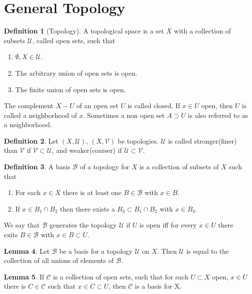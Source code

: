 \documentclass[twocolumn]{article}
\theoremstyle{definition}
\newtheorem{definition}{Definition}[section]
\newtheorem{lemma}[definition]{Lemma}
\begin{document}
\section{General Topology}
\begin{definition}[Topology]
    A topological space is a set $X$ with a collection of subsets $\mathcal{U}$, called open sets, such that
    \begin{enumerate}[noitemsep]
        \item $\emptyset, X \in \mathcal{U}$.
        \item The arbitrary union of open sets is open.
        \item The finite union of open sets is open.
    \end{enumerate}
    The complement $X - U$ of an open set $U$ is called closed. If $x \in U$ open, then $U$ is called a neighborhood of $x$. Sometimes a non open set $A \supset U$ is also referred to as a neighborhood.
\end{definition}
\begin{definition}
    Let $(X, \mathcal{U})$, $(X, \mathcal{V})$ be topologies.
    $\mathcal{U}$ is called stronger(finer) than $\mathcal{V}$ if $\mathcal{V} \subset \mathcal{U}$,
    and weaker(coarser) if $\mathcal{U} \subset \mathcal{V}$.
\end{definition}
\begin{definition}
    A basis $\mathcal{B}$ of a topology for $X$ is a collection of subsets of $X$ such that
    \begin{enumerate}[noitemsep]
        \item For each $x \in X$ there is at least one $B \in \mathcal{B}$ with $x \in B$.
        \item If $x \in B_1 \cap B_2$ then there exists a $B_3 \subset B_1 \cap B_2$ with $x \in B_3$.
    \end{enumerate}
    We say that $\mathcal{B}$ generates the topology $\mathcal{U}$ if $U$ is open iff for every $x \in U$ there exits $B \in \mathcal{B}$ with $x \in B \subset U$.
\end{definition}
\begin{lemma}
    Let $\mathcal{B}$ be a basis for a topology $\mathcal{U}$ on $X$.
    Then $\mathcal{U}$ is equal to the collection of all unions of elements of $\mathcal{B}$.
\end{lemma}
\begin{lemma}
    If $\mathcal{C}$ is a collection of open sets, such that for each $U \subset X$ open, $x \in U$
    there is $C \in \mathcal{C}$ such that $x \in C \subset U$, then $\mathcal{C}$ is a basis for X.
\end{lemma}
\end{document}
